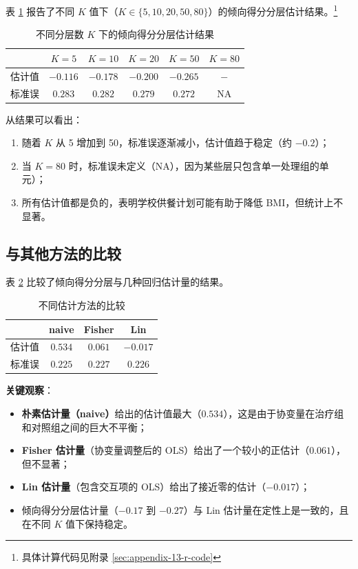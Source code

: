表 \ref{tab:13-strat-results} 报告了不同 $K$ 值下（$K \in \{5, 10, 20, 50, 80\}$）的倾向得分分层估计结果。\footnote{具体计算代码见附录 \cref{sec:appendix-13-r-code}}

\begin{table}[htbp]
\centering
\caption{不同分层数 $K$ 下的倾向得分分层估计结果}\label{tab:13-strat-results}
\begin{tabular}{cccccc}
\hline
 & $K=5$ & $K=10$ & $K=20$ & $K=50$ & $K=80$ \\
\hline
估计值 & $-0.116$ & $-0.178$ & $-0.200$ & $-0.265$ & $-$ \\
标准误 & $0.283$ & $0.282$ & $0.279$ & $0.272$ & NA \\
\hline
\end{tabular}
\end{table}

从结果可以看出：
\begin{enumerate}
  \item 随着 $K$ 从 5 增加到 50，标准误逐渐减小，估计值趋于稳定（约 $-0.2$）；
  \item 当 $K=80$ 时，标准误未定义（NA），因为某些层只包含单一处理组的单元）；
  \item 所有估计值都是负的，表明学校供餐计划可能有助于降低 BMI，但统计上不显著。
\end{enumerate}

\subsection{与其他方法的比较}\label{sec:13-comparison}

表 \ref{tab:13-compare-regression} 比较了倾向得分分层与几种回归估计量的结果。

\begin{table}[htbp]
\centering
\caption{不同估计方法的比较}\label{tab:13-compare-regression}
\begin{tabular}{cccc}
\hline
 & naive & Fisher & Lin \\
\hline
估计值 & $0.534$ & $0.061$ & $-0.017$ \\
标准误 & $0.225$ & $0.227$ & $0.226$ \\
\hline
\end{tabular}
\end{table}

\textbf{关键观察}：
\begin{itemize}
  \item \textbf{朴素估计量（naive）}给出的估计值最大（$0.534$），这是由于协变量在治疗组和对照组之间的巨大不平衡；
  \item \textbf{Fisher 估计量}（协变量调整后的 OLS）给出了一个较小的正估计（$0.061$），但不显著；
  \item \textbf{Lin 估计量}（包含交互项的 OLS）给出了接近零的估计（$-0.017$）；
  \item 倾向得分分层估计量（$-0.17$ 到 $-0.27$）与 Lin 估计量在定性上是一致的，且在不同 $K$ 值下保持稳定。
\end{itemize}

